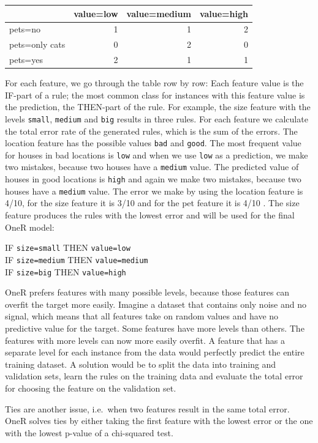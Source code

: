 \documentclass[
  12pt,
]{krantz}
\begin{document}
\begin{tabular}{l|r|r|r}
\hline
  & value=low & value=medium & value=high\\
\hline
pets=no & 1 & 1 & 2\\
\hline
pets=only cats & 0 & 2 & 0\\
\hline
pets=yes & 2 & 1 & 1\\
\hline
\end{tabular}

For each feature, we go through the table row by row:
Each feature value is the IF-part of a rule;
the most common class for instances with this feature value is the prediction, the THEN-part of the rule.
For example, the size feature with the levels \texttt{small}, \texttt{medium} and \texttt{big} results in three rules.
For each feature we calculate the total error rate of the generated rules, which is the sum of the errors.
The location feature has the possible values \texttt{bad} and \texttt{good}.
The most frequent value for houses in bad locations is \texttt{low} and when we use \texttt{low} as a prediction, we make two mistakes, because two houses have a \texttt{medium} value.
The predicted value of houses in good locations is \texttt{high} and again we make two mistakes, because two houses have a \texttt{medium} value.
The error we make by using the location feature is 4/10, for the size feature it is 3/10 and for the pet feature it is 4/10 .
The size feature produces the rules with the lowest error and will be used for the final OneR model:

IF \texttt{size=small} THEN \texttt{value=low}\\
IF \texttt{size=medium} THEN \texttt{value=medium}\\
IF \texttt{size=big} THEN \texttt{value=high}

OneR prefers features with many possible levels, because those features can overfit the target more easily.
Imagine a dataset that contains only noise and no signal, which means that all features take on random values and have no predictive value for the target.
Some features have more levels than others.
The features with more levels can now more easily overfit.
A feature that has a separate level for each instance from the data would perfectly predict the entire training dataset.
A solution would be to split the data into training and validation sets, learn the rules on the training data and evaluate the total error for choosing the feature on the validation set.

Ties are another issue, i.e.~when two features result in the same total error.
OneR solves ties by either taking the first feature with the lowest error or the one with the lowest p-value of a chi-squared test.
\end{document}
